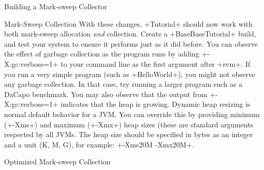 \begin{section}{Building a Mark-sweep Collector}
\begin{subsection}{Mark-Sweep Collection}
With these changes, \spverb+Tutorial+ should now work with both mark-sweep allocation \textit{and} collection. Create a \spverb+BaseBaseTutorial+ build, and test your system to ensure it performs just as it did before. You can observe the effect of garbage collection as the program runs by adding \spverb+-X:gc:verbose=1+ to your command line as the first argument after \spverb+rvm+. If you run a very simple program (such as \spverb+HelloWorld+), you might not observe any garbage collection. In that case, try running a larger program such as a DaCapo benchmark. You may also observe that the output from \spverb+-X:gc:verbose=1+ indicates that the heap is growing. Dynamic heap resizing is normal default behavior for a JVM. You can override this by providing minimum (\spverb+-Xms+) and maximum (\spverb+-Xmx+) heap sizes (these are standard arguments respected by all JVMs. The heap size should be specified in bytes as an integer and a unit (K, M, G), for example: \spverb+-Xms20M -Xmx20M+.

\end{subsection}

\begin{subsection}{Optimized Mark-sweep Collection}


\end{subsection}
\end{section}

